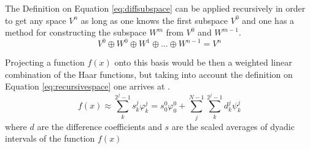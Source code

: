 \documentclass[../master_thesis.tex]{subfiles}
\begin{document}
The Definition on Equation \ref{eq:diffsubspace} can be applied recursively in order to
get any space $V^n$ as long as one knows the first subspace $V^0$ and one has a method for constructing the
subspace $W^m$ from $V^0$ and $W^{m-1}$.
\begin{equation}
    V^0 \oplus W^0 \oplus W^1 \oplus ... \oplus W^{n-1}  = V^n \label{eq:recursivespace}
\end{equation}

Projecting a function $f(x)$ onto this basis would be then a weighted linear combination
of the Haar functions, but taking into account the definition on Equation \ref{eq:recursivespace} one arrives
at \cite{Sorland}.
\begin{equation}\label{eq:projectftohaar}
  f(x)\approx \sum^{2^j -1}_k s^j_k\varphi^j_k = s^0_0\varphi^0_0 + \sum^{N - 1}_j\sum^{2^j -1}_k d^j_k\psi^j_k
\end{equation}
where $d$ are the difference coefficients and $s$ are the scaled averages of dyadic intervals of the function $f(x)$
\end{document}

